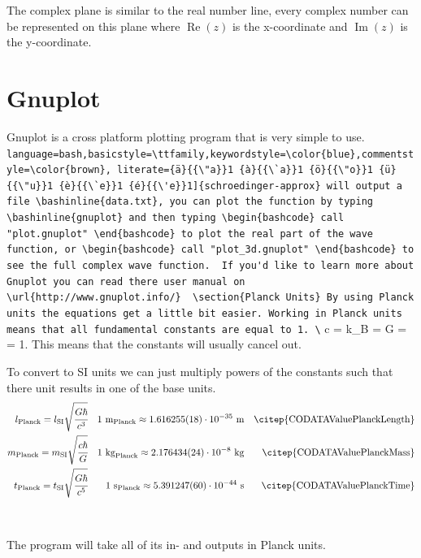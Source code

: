 \documentclass[11pt,DIV=10,final]{scrreprt} %
\providecommand{\bashinline}{\lstinline[language=bash,basicstyle=\ttfamily,keywordstyle=\color{blue},commentstyle=\color{brown}, literate={ä}{{\"a}}1 {à}{{\`a}}1 {ö}{{\"o}}1 {ü}{{\"u}}1 {è}{{\`e}}1 {é}{{\'e}}1]} % für Inline-C++ Code
\begin{document}
The complex plane is similar to the real number line, every complex number can be represented on this plane where $\operatorname{Re}(z)$ is the x-coordinate and $\operatorname{Im}(z)$ is the y-coordinate.

\section{Gnuplot}
Gnuplot is a cross platform plotting program that is very simple to use. \bashinline{schroedinger-approx} will output a file \bashinline{data.txt}, you can plot the function by typing \bashinline{gnuplot}
and then typing
\begin{bashcode}
call "plot.gnuplot"
\end{bashcode}
to plot the real part of the wave function, or
\begin{bashcode}
call "plot_3d.gnuplot"
\end{bashcode}
to see the full complex wave function.

If you'd like to learn more about Gnuplot you can read there user manual on \url{http://www.gnuplot.info/}

\section{Planck Units}
By using Planck units the equations get a little bit easier.
Working in Planck units means that all fundamental constants are equal to 1.
\[
  c = k_{B} = G = \hbar = 1.
\]
This means that the constants will usually cancel out.

To convert to SI units we can just multiply powers of the constants such that there unit results in one of the base units.
\begin{align*}
l_{\text{Planck}} = l_{\text{SI}} \sqrt{\cfrac{G \hbar}{c^{3}}}  && 1~\text{m}_{\text{Planck}}  \approx 1.616255(18) \cdot 10^{-35}~\text{m}  && \text{\citep{CODATAValuePlanckLength}} \\
m_{\text{Planck}} = m_{\text{SI}} \sqrt{\cfrac{c \hbar}{G}}      && 1~\text{kg}_{\text{Planck}} \approx  2.176434(24) \cdot 10^{-8}~\text{kg} && \text{\citep{CODATAValuePlanckMass}} \\
t_{\text{Planck}} = t_{\text{SI}} \sqrt{\cfrac{G \hbar}{c^{5}}} && 1~\text{s}_{\text{Planck}}  \approx 5.391247(60) \cdot 10^{-44}~\text{s}  && \text{\citep{CODATAValuePlanckTime}}
\end{align*}
\hspace*{\fill}~\citep[Table 1]{gaarder2016gravitational} \\
\\
The program will take all of its in- and outputs in Planck units.
\end{document}
